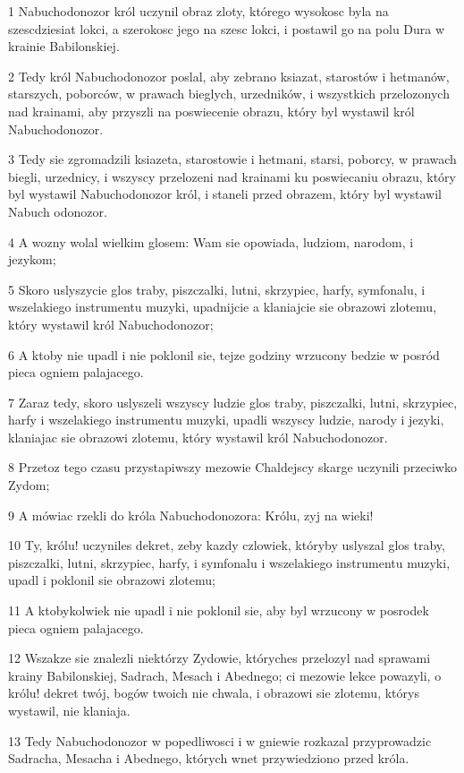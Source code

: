 \par 1 Nabuchodonozor król uczynil obraz zloty, którego wysokosc byla na szescdziesiat lokci, a szerokosc jego na szesc lokci, i postawil go na polu Dura w krainie Babilonskiej.
\par 2 Tedy król Nabuchodonozor poslal, aby zebrano ksiazat, starostów i hetmanów, starszych, poborców, w prawach bieglych, urzedników, i wszystkich przelozonych nad krainami, aby przyszli na poswiecenie obrazu, który byl wystawil król Nabuchodonozor.
\par 3 Tedy sie zgromadzili ksiazeta, starostowie i hetmani, starsi, poborcy, w prawach biegli, urzednicy, i wszyscy przelozeni nad krainami ku poswiecaniu obrazu, który byl wystawil Nabuchodonozor król, i staneli przed obrazem, który byl wystawil Nabuch odonozor.
\par 4 A wozny wolal wielkim glosem: Wam sie opowiada, ludziom, narodom, i jezykom;
\par 5 Skoro uslyszycie glos traby, piszczalki, lutni, skrzypiec, harfy, symfonalu, i wszelakiego instrumentu muzyki, upadnijcie a klaniajcie sie obrazowi zlotemu, który wystawil król Nabuchodonozor;
\par 6 A ktoby nie upadl i nie poklonil sie, tejze godziny wrzucony bedzie w posród pieca ogniem palajacego.
\par 7 Zaraz tedy, skoro uslyszeli wszyscy ludzie glos traby, piszczalki, lutni, skrzypiec, harfy i wszelakiego instrumentu muzyki, upadli wszyscy ludzie, narody i jezyki, klaniajac sie obrazowi zlotemu, który wystawil król Nabuchodonozor.
\par 8 Przetoz tego czasu przystapiwszy mezowie Chaldejscy skarge uczynili przeciwko Zydom;
\par 9 A mówiac rzekli do króla Nabuchodonozora: Królu, zyj na wieki!
\par 10 Ty, królu! uczyniles dekret, zeby kazdy czlowiek, któryby uslyszal glos traby, piszczalki, lutni, skrzypiec, harfy, i symfonalu i wszelakiego instrumentu muzyki, upadl i poklonil sie obrazowi zlotemu;
\par 11 A ktobykolwiek nie upadl i nie poklonil sie, aby byl wrzucony w posrodek pieca ogniem palajacego.
\par 12 Wszakze sie znalezli niektórzy Zydowie, któryches przelozyl nad sprawami krainy Babilonskiej, Sadrach, Mesach i Abednego; ci mezowie lekce powazyli, o królu! dekret twój, bogów twoich nie chwala, i obrazowi sie zlotemu, którys wystawil, nie klaniaja.
\par 13 Tedy Nabuchodonozor w popedliwosci i w gniewie rozkazal przyprowadzic Sadracha, Mesacha i Abednego, których wnet przywiedziono przed króla.
